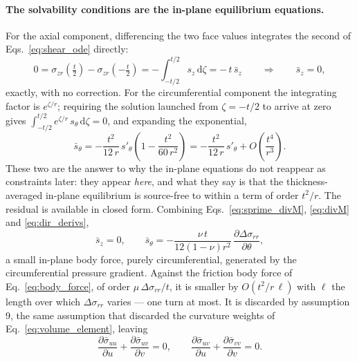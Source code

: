 \documentclass[11pt]{article}
\begin{document}
\paragraph{The solvability conditions are the in-plane equilibrium equations.}
For the axial component, differencing the two face values integrates the second
of Eqs.~\eqref{eq:shear_ode} directly:
\begin{equation}\label{eq:solv_axial}
    0 = \sigma_{zr}\!\left(\tfrac t2\right)
      - \sigma_{zr}\!\left(-\tfrac t2\right)
      = -\int_{-t/2}^{t/2} s_z\,\mathrm d\zeta = -\,t\,\bar s_z
    \qquad\Longrightarrow\qquad
    \bar s_z = 0,
\end{equation}
exactly, with no correction. For the circumferential component the integrating
factor is $e^{\zeta/r}$; requiring the solution launched from $\zeta = -t/2$ to
arrive at zero gives
$\int_{-t/2}^{t/2}e^{\zeta/r}\,s_\theta\,\mathrm d\zeta = 0$, and expanding the
exponential,
\begin{equation}\label{eq:solv_circ}
    \bar s_\theta
      = -\frac{t^{2}}{12\,r}\,s'_\theta
        \left(1 - \frac{t^{2}}{60\,r^{2}}\right)
      = -\frac{t^{2}}{12\,r}\,s'_\theta
        + O\!\left(\frac{t^{4}}{r^{3}}\right).
\end{equation}
These two are the answer to why the in-plane equations do not reappear as
constraints later: they appear \emph{here}, and what they say is that the
thickness-averaged in-plane equilibrium is source-free to within a term of order
$t^{2}/r$. The residual is available in closed form. Combining
Eqs.~\eqref{eq:sprime_divM}, \eqref{eq:divM} and \eqref{eq:dir_derivs},
\begin{equation}\label{eq:residual_source}
    \bar s_z = 0,
    \qquad
    \bar s_\theta = -\frac{\nu\,t}{12\left(1-\nu\right)r^{2}}\,
      \frac{\partial \Delta\sigma_{rr}}{\partial \theta},
\end{equation}
a small in-plane body force, purely circumferential, generated by the
circumferential pressure gradient. Against the friction body force of
Eq.~\eqref{eq:body_force}, of order $\mu\,\Delta\sigma_{rr}/t$, it is smaller by
$O\!\left(t^{2}/r\,\ell\right)$ with $\ell$ the length over which
$\Delta\sigma_{rr}$ varies --- one turn at most. It is discarded by assumption 9,
the same assumption that discarded the curvature weights of
Eq.~\eqref{eq:volume_element}, leaving
\begin{equation}\label{eq:inplane_sourcefree}
    \boxed{\;\frac{\partial \bar\sigma_{uu}}{\partial u}
      + \frac{\partial \bar\sigma_{uv}}{\partial v} = 0,
    \qquad
    \frac{\partial \bar\sigma_{uv}}{\partial u}
      + \frac{\partial \bar\sigma_{vv}}{\partial v} = 0.\;}
\end{equation}
\end{document}
